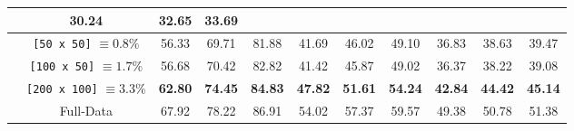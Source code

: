 \begin{table*}
\begin{center}
{\begin{tabular}{c c | c c c c c c c c c }
                                       & 30.24  & 32.65  & 33.69  \\
    \midrule
    & \texttt{[50 x 50]} $\equiv0.8\%$ &                   56.33    &                   69.71    &                   81.88    
                                       &                   41.69    &                   46.02    &                   49.10    
                                       &                   36.83    &                   38.63    &                   39.47    \\
    & \texttt{[100 x 50]} $\equiv1.7\%$ &                  56.68    &                   70.42    &                   82.82 
                                       &                   41.42    &                   45.87    &                   49.02    
                                       &                   36.37    &                   38.22    &                   39.08    \\
    & \texttt{[200 x 100]} $\equiv3.3\%$ &         \textbf{62.80 }  &           \textbf{74.45 }  &           \textbf{84.83 }   
                                       &           \textbf{47.82 }  &           \textbf{51.61 }  &           \textbf{54.24 }   
                                       &           \textbf{42.84 }  &           \textbf{44.42 }  &           \textbf{45.14 }  \\
    & Full-Data                        & 67.92  & 78.22  & 86.91  
                                       & 54.02  & 57.37  & 59.57 
                                       & 49.38  & 50.78  & 51.38  \\
    \bottomrule
\end{tabular}}
\end{center}
\end{table*}

